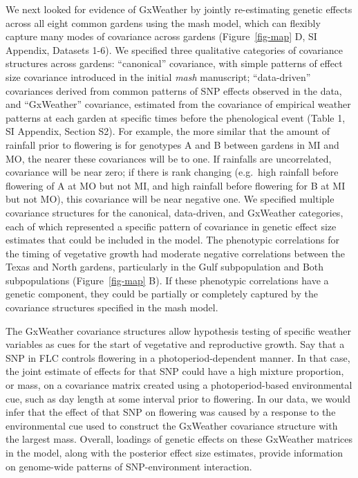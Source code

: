 \documentclass[
  9pt,
  twocolumn,
  twoside]{pnas-new}
\begin{document}
We next looked for evidence of GxWeather by jointly re-estimating
genetic effects across all eight common gardens using the mash model,
which can flexibly capture many modes of covariance across gardens
(Figure~\ref{fig-map} D, SI Appendix, Datasets 1-6). We specified three
qualitative categories of covariance structures across gardens:
``canonical'' covariance, with simple patterns of effect size covariance
introduced in the initial \emph{mash} manuscript; ``data-driven''
covariances derived from common patterns of SNP effects observed in the
data, and ``GxWeather'' covariance, estimated from the covariance of
empirical weather patterns at each garden at specific times before the
phenological event (Table 1, SI Appendix, Section S2). For example, the
more similar that the amount of rainfall prior to flowering is for
genotypes A and B between gardens in MI and MO, the nearer these
covariances will be to one. If rainfalls are uncorrelated, covariance
will be near zero; if there is rank changing (e.g.~high rainfall before
flowering of A at MO but not MI, and high rainfall before flowering for
B at MI but not MO), this covariance will be near negative one. We
specified multiple covariance structures for the canonical, data-driven,
and GxWeather categories, each of which represented a specific pattern
of covariance in genetic effect size estimates that could be included in
the model. The phenotypic correlations for the timing of vegetative
growth had moderate negative correlations between the Texas and North
gardens, particularly in the Gulf subpopulation and Both subpopulations
(Figure~\ref{fig-map} B). If these phenotypic correlations have a
genetic component, they could be partially or completely captured by the
covariance structures specified in the mash model.

The GxWeather covariance structures allow hypothesis testing of specific
weather variables as cues for the start of vegetative and reproductive
growth. Say that a SNP in FLC controls flowering in a
photoperiod-dependent manner. In that case, the joint estimate of
effects for that SNP could have a high mixture proportion, or mass, on a
covariance matrix created using a photoperiod-based environmental cue,
such as day length at some interval prior to flowering. In our data, we
would infer that the effect of that SNP on flowering was caused by a
response to the environmental cue used to construct the GxWeather
covariance structure with the largest mass. Overall, loadings of genetic
effects on these GxWeather matrices in the model, along with the
posterior effect size estimates, provide information on genome-wide
patterns of SNP-environment interaction.
\end{document}

